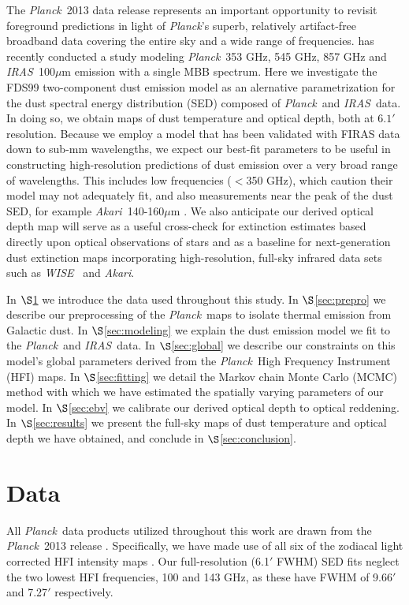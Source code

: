 \documentclass{emulateapj}
\newcommand{\IRAS}{{\it IRAS}}
\newcommand{\PLANCK}{{\it Planck}}
\newcommand{\AKARI}{{\it Akari}}
\newcommand{\WISE}{{\it WISE}}
\begin{document}
The \PLANCK~2013 data release \citep{planck2013} represents an important 
opportunity to revisit foreground predictions in light of \PLANCK's superb, 
relatively artifact-free broadband data covering the entire sky and a wide 
range of frequencies. \cite{planckdust} has recently conducted a study modeling
\PLANCK~353 GHz, 545 GHz, 857 GHz and \IRAS~100$\mu$m emission with a single
MBB spectrum. Here we investigate the FDS99 two-component dust emission model 
as an alernative parametrization for the dust spectral energy distribution 
(SED) composed  of \PLANCK~and \IRAS~data. In doing so, we obtain maps of dust 
temperature and optical depth, both at $6.1'$ resolution. Because we employ a 
model that has been validated with FIRAS data down to sub-mm wavelengths, we 
expect our best-fit parameters to be useful in constructing high-resolution 
predictions of dust emission over a very broad range of wavelengths. This 
includes low frequencies ($<$350 GHz), which \cite{planckdust} caution their 
model may not adequately fit, and also measurements near the peak of the dust 
SED, for example \AKARI~140-160$\mu$m \citep{akari}. We also anticipate our 
derived optical depth map will serve as a useful cross-check for extinction 
estimates based directly upon optical observations of stars
\citep[e.g.][]{green14} and as a baseline for next-generation dust extinction 
maps incorporating high-resolution, full-sky infrared data sets such as 
\WISE~\citep{wright10, meisner14} and \AKARI.


In $\S$\ref{sec:data} we introduce the data used throughout this study. In 
$\S$\ref{sec:prepro} we describe our preprocessing of the \PLANCK~maps to 
isolate thermal emission from Galactic dust. In $\S$\ref{sec:modeling} we 
explain the dust emission model we fit to the \PLANCK~and \IRAS~data. In 
$\S$\ref{sec:global} we describe our constraints on this model's global 
parameters derived from the \PLANCK~High Frequency Instrument (HFI) maps. In 
$\S$\ref{sec:fitting} we detail the Markov chain Monte Carlo (MCMC) method with
which we have estimated the spatially varying parameters of our model. In 
$\S$\ref{sec:ebv} we calibrate our derived optical depth to optical reddening. 
In $\S$\ref{sec:results} we present the full-sky maps of dust temperature and 
optical depth we have obtained, and conclude in $\S$\ref{sec:conclusion}.

\section{Data}
\label{sec:data}
All \PLANCK~data products utilized throughout this work are drawn from the 
\PLANCK~2013 release \citep{planck2013}. Specifically, we have made use 
of all six of the zodiacal light corrected HFI intensity maps
\citep[\texttt{R1.10\_nominal\_ZodiCorrected},][]{planckzodi}. Our 
full-resolution (6.1$'$ FWHM) SED fits neglect the two lowest HFI frequencies, 
100 and 143 GHz, as these have FWHM of 9.66$'$ and 7.27$'$ respectively.
\end{document}
